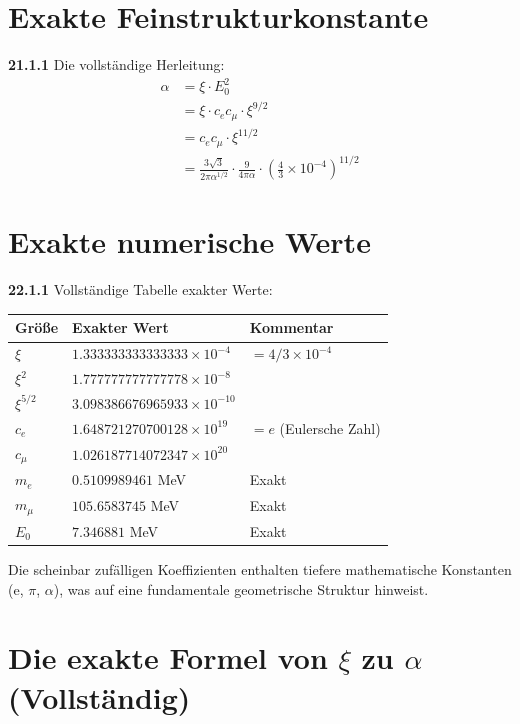 \section{Exakte Feinstrukturkonstante}
\noindent \textbf{21.1.1} Die vollständige Herleitung:
\begin{align}
	\alpha &= \xi \cdot E_0^2 \\
	&= \xi \cdot c_e c_\mu \cdot \xi^{9/2} \\
	&= c_e c_\mu \cdot \xi^{11/2} \\
	&= \frac{3\sqrt{3}}{2\pi\alpha^{1/2}} \cdot \frac{9}{4\pi\alpha} \cdot \left(\frac{4}{3} \times 10^{-4}\right)^{11/2}
\end{align}

\section{Exakte numerische Werte}

\noindent \textbf{22.1.1} Vollständige Tabelle exakter Werte:

\begin{table}[h]
	\centering
	\begin{tabular}{lll}
		\toprule
		Größe & Exakter Wert & Kommentar \\
		\midrule
		$\xi$ & $1.333333333333333 \times 10^{-4}$ & $= 4/3 \times 10^{-4}$ \\
		$\xi^2$ & $1.777777777777778 \times 10^{-8}$ & \\
		$\xi^{5/2}$ & $3.098386676965933 \times 10^{-10}$ & \\
		$c_e$ & $1.648721270700128 \times 10^{19}$ & $= e$ (Eulersche Zahl) \\
		$c_\mu$ & $1.026187714072347 \times 10^{20}$ & \\
		$m_e$ & $0.5109989461$ MeV & Exakt \\
		$m_\mu$ & $105.6583745$ MeV & Exakt \\
		$E_0$ & $7.346881$ MeV & Exakt \\
		\bottomrule
	\end{tabular}
\end{table}

Die scheinbar zufälligen Koeffizienten enthalten tiefere mathematische Konstanten (e, $\pi$, $\alpha$), was auf eine fundamentale geometrische Struktur hinweist.

\section{Die exakte Formel von $\xi$ zu $\alpha$ (Vollständig)}

